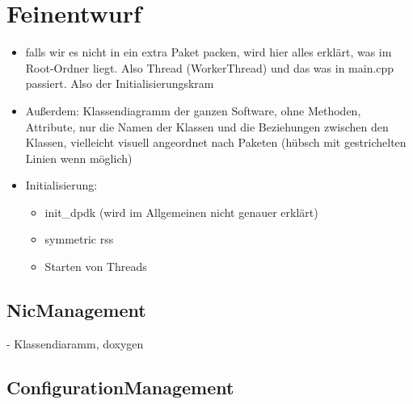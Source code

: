 \documentclass[../review_2.tex]{subfiles}
\begin{document}
\chapter{Feinentwurf}\thispagestyle{fancy}

\begin{itemize}
\item falls wir es nicht in ein extra Paket packen, wird hier alles erklärt, was im Root-Ordner liegt. Also Thread (WorkerThread) und das was in main.cpp passiert. Also der Initialisierungskram
\item Außerdem: Klassendiagramm der ganzen Software, ohne Methoden, Attribute, nur die Namen der Klassen und die Beziehungen zwischen den Klassen, vielleicht visuell angeordnet nach Paketen (hübsch mit gestrichelten Linien wenn möglich)\\

\item Initialisierung:
    \begin{itemize}
    \item init\_dpdk (wird im Allgemeinen nicht genauer erklärt)
    \item symmetric rss
    \item Starten von Threads
    \end{itemize}

\end{itemize}

\section{NicManagement}
- Klassendiaramm, doxygen

\section{ConfigurationManagement}
\end{document}
